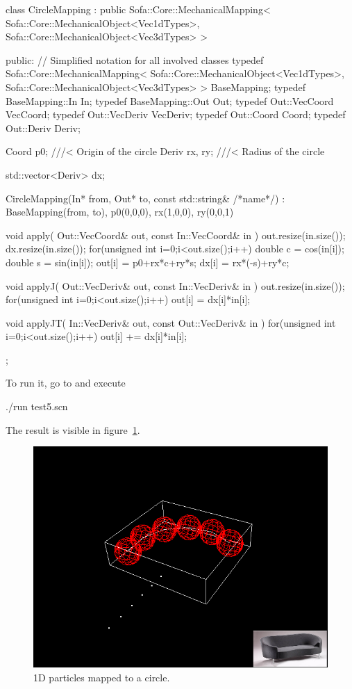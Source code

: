 \begin{code_cpp}
class CircleMapping : public Sofa::Core::MechanicalMapping< Sofa::Core::MechanicalObject<Vec1dTypes>, Sofa::Core::MechanicalObject<Vec3dTypes> >
{
public:
  // Simplified notation for all involved classes
  typedef Sofa::Core::MechanicalMapping< Sofa::Core::MechanicalObject<Vec1dTypes>, Sofa::Core::MechanicalObject<Vec3dTypes> > BaseMapping;
  typedef BaseMapping::In In;
  typedef BaseMapping::Out Out;
  typedef Out::VecCoord VecCoord;
  typedef Out::VecDeriv VecDeriv;
  typedef Out::Coord Coord;
  typedef Out::Deriv Deriv;

  Coord p0; ///< Origin of the circle
  Deriv rx, ry; ///< Radius of the circle
  
  std::vector<Deriv> dx;
  
  CircleMapping(In* from, Out* to, const std::string& /*name*/)
  : BaseMapping(from, to), p0(0,0,0), rx(1,0,0), ry(0,0,1)
  {
  }
  
  void apply( Out::VecCoord& out, const In::VecCoord& in )
  {
    out.resize(in.size());
    dx.resize(in.size());
    for(unsigned int i=0;i<out.size();i++)
    {
	  double c = cos(in[i]);
	  double s = sin(in[i]);
      out[i] = p0+rx*c+ry*s;
	  dx[i] = rx*(-s)+ry*c;
    }
  }
  
  void applyJ( Out::VecDeriv& out, const In::VecDeriv& in )
  {
    out.resize(in.size());
    for(unsigned int i=0;i<out.size();i++)
      out[i] = dx[i]*in[i];
  }
  
  void applyJT( In::VecDeriv& out, const Out::VecDeriv& in )
  {
    for(unsigned int i=0;i<out.size();i++)
      out[i] += dx[i]*in[i];
  }
};
\end{code_cpp}

To run it, go to  and execute
\begin{code_bash}
./run test5.scn
\end{code_bash}

The result is visible in figure~\ref{fig:mass1d-circle}.

\begin{figure}
\centering
\includegraphics[width=0.5\linewidth]{fig/mass1d-circle1}
\caption{1D particles mapped to a circle.}\label{fig:mass1d-circle}
\end{figure}

